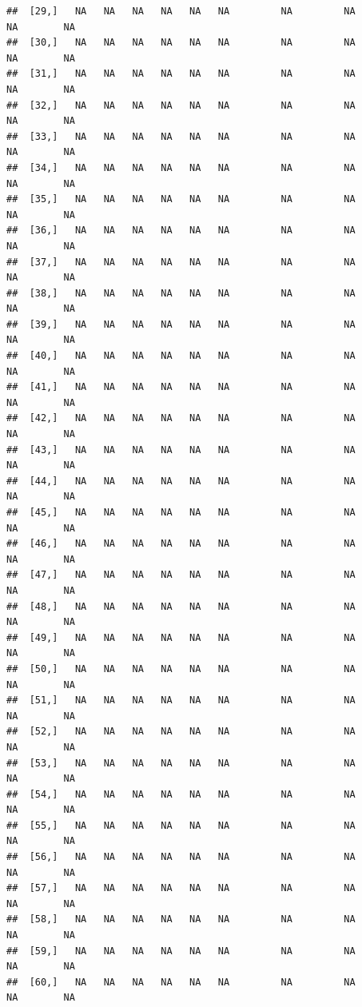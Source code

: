 \documentclass{article}\usepackage[]{graphicx}\usepackage[]{color}
\makeatletter
\newenvironment{kframe}{%
 \def\at@end@of@kframe{}%
 \ifinner\ifhmode%
  \def\at@end@of@kframe{\end{minipage}}%
  \begin{minipage}{\columnwidth}%
 \fi\fi%
 \def\FrameCommand##1{\hskip\@totalleftmargin \hskip-\fboxsep
 \colorbox{shadecolor}{##1}\hskip-\fboxsep
     \hskip-\linewidth \hskip-\@totalleftmargin \hskip\columnwidth}%
 \MakeFramed {\advance\hsize-\width
   \@totalleftmargin\z@ \linewidth\hsize
   \@setminipage}}%
 {\par\unskip\endMakeFramed%
 \at@end@of@kframe}
\newenvironment{knitrout}{}{} %
\makeatother
\begin{document}
\begin{knitrout}
\begin{kframe}
\begin{verbatim}
##  [29,]   NA   NA   NA   NA   NA   NA         NA         NA         NA        NA
##  [30,]   NA   NA   NA   NA   NA   NA         NA         NA         NA        NA
##  [31,]   NA   NA   NA   NA   NA   NA         NA         NA         NA        NA
##  [32,]   NA   NA   NA   NA   NA   NA         NA         NA         NA        NA
##  [33,]   NA   NA   NA   NA   NA   NA         NA         NA         NA        NA
##  [34,]   NA   NA   NA   NA   NA   NA         NA         NA         NA        NA
##  [35,]   NA   NA   NA   NA   NA   NA         NA         NA         NA        NA
##  [36,]   NA   NA   NA   NA   NA   NA         NA         NA         NA        NA
##  [37,]   NA   NA   NA   NA   NA   NA         NA         NA         NA        NA
##  [38,]   NA   NA   NA   NA   NA   NA         NA         NA         NA        NA
##  [39,]   NA   NA   NA   NA   NA   NA         NA         NA         NA        NA
##  [40,]   NA   NA   NA   NA   NA   NA         NA         NA         NA        NA
##  [41,]   NA   NA   NA   NA   NA   NA         NA         NA         NA        NA
##  [42,]   NA   NA   NA   NA   NA   NA         NA         NA         NA        NA
##  [43,]   NA   NA   NA   NA   NA   NA         NA         NA         NA        NA
##  [44,]   NA   NA   NA   NA   NA   NA         NA         NA         NA        NA
##  [45,]   NA   NA   NA   NA   NA   NA         NA         NA         NA        NA
##  [46,]   NA   NA   NA   NA   NA   NA         NA         NA         NA        NA
##  [47,]   NA   NA   NA   NA   NA   NA         NA         NA         NA        NA
##  [48,]   NA   NA   NA   NA   NA   NA         NA         NA         NA        NA
##  [49,]   NA   NA   NA   NA   NA   NA         NA         NA         NA        NA
##  [50,]   NA   NA   NA   NA   NA   NA         NA         NA         NA        NA
##  [51,]   NA   NA   NA   NA   NA   NA         NA         NA         NA        NA
##  [52,]   NA   NA   NA   NA   NA   NA         NA         NA         NA        NA
##  [53,]   NA   NA   NA   NA   NA   NA         NA         NA         NA        NA
##  [54,]   NA   NA   NA   NA   NA   NA         NA         NA         NA        NA
##  [55,]   NA   NA   NA   NA   NA   NA         NA         NA         NA        NA
##  [56,]   NA   NA   NA   NA   NA   NA         NA         NA         NA        NA
##  [57,]   NA   NA   NA   NA   NA   NA         NA         NA         NA        NA
##  [58,]   NA   NA   NA   NA   NA   NA         NA         NA         NA        NA
##  [59,]   NA   NA   NA   NA   NA   NA         NA         NA         NA        NA
##  [60,]   NA   NA   NA   NA   NA   NA         NA         NA         NA        NA

\end{verbatim}
\end{kframe}
\end{knitrout}
\end{document}
